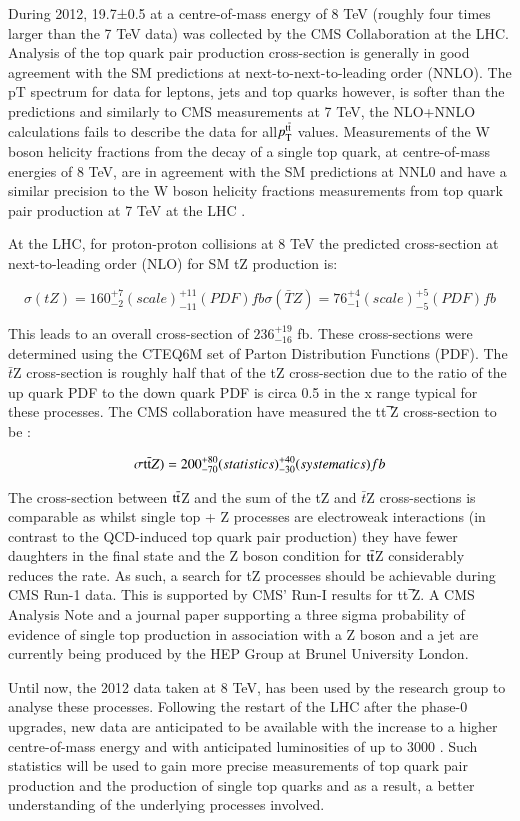During 2012, 19.7±0.5 \fbinv at a centre-of-mass energy of 8 TeV (roughly four times larger than the 7 TeV data) was collected by the CMS Collaboration at the LHC. 
Analysis of the top quark pair production cross-section is generally in good agreement with the SM predictions at next-to-next-to-leading order (NNLO). 
The pT spectrum for data for leptons, jets and top quarks however, is softer than the predictions and similarly to CMS measurements at 7 TeV, the NLO+NNLO calculations fails to describe the data for all$ p_{\mathrm{T}}^{\mathrm{t}\overline{\mathrm{t}}}$ values. 
Measurements of the W boson helicity fractions from the decay of a single top quark, at centre-of-mass energies of 8 TeV, are in agreement with the SM predictions at NNL0  and have a similar precision to the W boson helicity fractions measurements from top quark pair production at 7 TeV at the LHC .

At the LHC, for proton-proton collisions at 8 TeV the predicted cross-section at next-to-leading order (NLO) for SM tZ production is:

\begin{equation}
\sigma(tZ)= 160_{-2}^{+7} (scale)_{-11}^{+11} (PDF)  fb
\sigma(\bar{T}Z)= 76_{-1}^{+4} (scale)_{-5}^{+5} (PDF) fb
\end{equation}

This leads to an overall cross-section of $236_{-16}^{+19}$ fb. 
These cross-sections were determined using the CTEQ6M set of Parton Distribution Functions (PDF). 
The $\bar{t}$Z cross-section is roughly half that of the tZ cross-section due to the ratio of the up quark PDF to the down quark PDF is circa 0.5 in the x range typical for these processes. 
The CMS collaboration have measured the tt ̅Z cross-section to be :

\begin{equation}
\sigma \mathrm{t}\overline{\mathrm{t}} Z)= 200_{-70}^{+80} (statistics)_{-30}^{+40} (systematics) fb
\end{equation}

The cross-section between $\mathrm{t}\overline{\mathrm{t}}$Z and the sum of the tZ and $\bar{t}$Z cross-sections is comparable as whilst single top + Z processes are electroweak interactions (in contrast to the QCD-induced top quark pair production) they have fewer daughters in the final state and the Z boson condition for $\mathrm{t}\overline{\mathrm{t}}$Z considerably reduces the rate.
As such, a search for tZ processes should be achievable during CMS Run-1 data. This is supported by CMS’ Run-I results for tt ̅Z. 
A CMS Analysis Note and a journal paper supporting a three sigma probability of evidence of single top production in association with a Z boson and a jet are currently being produced by the HEP Group at Brunel University London.

Until now, the 2012 data taken at 8 TeV, has been used by the research group to analyse these processes.
Following the restart of the LHC after the phase-0 upgrades, new data are anticipated to be available with the increase to a higher centre-of-mass energy and with anticipated luminosities of up to 3000 \fbinv. 
Such statistics will be used to gain more precise measurements of top quark pair production and the production of single top quarks and as a result, a better understanding of the underlying processes involved.
